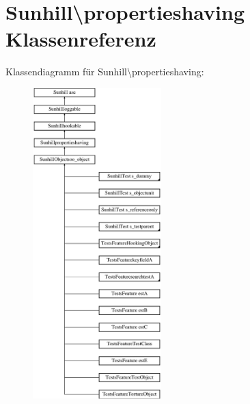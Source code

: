 \hypertarget{classSunhill_1_1propertieshaving}{}\section{Sunhill\textbackslash{}propertieshaving Klassenreferenz}
\label{classSunhill_1_1propertieshaving}
Klassendiagramm für Sunhill\textbackslash{}propertieshaving\+:\begin{figure}[H]
\begin{center}
\leavevmode
\includegraphics[height=12.000000cm]{d2/db8/classSunhill_1_1propertieshaving}
\end{center}
\end{figure}
